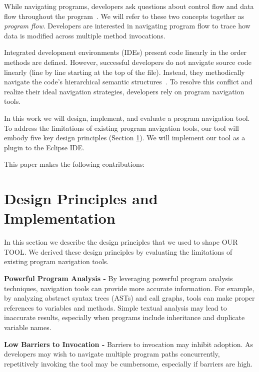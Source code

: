 \documentclass[conference]{IEEEtran}
\newcommand{\toolName}{OUR TOOL}
\begin{document}
While navigating programs, developers ask questions about control flow and data flow throughout the program~\cite{latoza2010hard, Smith2015}. We will refer to these two concepts together as \textit{program flow}. Developers are interested in navigating program flow to trace how data is modified across multiple method invocations.

Integrated development environments (IDEs) present code linearly in the order methods are defined. However, successful developers do not navigate source code linearly (line by line starting at the top of the file). Instead, they methodically navigate the code's hierarchical semantic structures~\cite{robillard2004investigate}. To resolve this conflict and realize their ideal navigation strategies, developers rely on program navigation tools. 


In this work we will design, implement, and evaluate a program navigation tool.
To address the limitations of existing program navigation tools, our tool will embody five key design principles (Section \ref{DesignPrinciples}). We will implement our tool as a plugin to the Eclipse IDE. 

This paper makes the following contributions:


\section{Design Principles and Implementation}
\label{DesignPrinciples}
In this section we describe the design principles that we used to shape \toolName. We derived these design principles by evaluating the limitations of existing program navigation tools.
 
\vspace{1em} 
\noindent\textbf{Powerful Program Analysis -}
By leveraging powerful program analysis techniques, navigation tools can provide more accurate information.
For example, by analyzing abstract syntax trees (ASTs) and call graphs, tools can make proper references to variables and methods. 
Simple textual analysis may lead to inaccurate results, especially when programs include inheritance and duplicate variable names.

\vspace{1em} 
\noindent\textbf{Low Barriers to Invocation -}
Barriers to invocation may inhibit adoption. 
As developers may wish to navigate multiple program paths concurrently, repetitively invoking the tool may be cumbersome, especially if barriers are high. 
\end{document}
